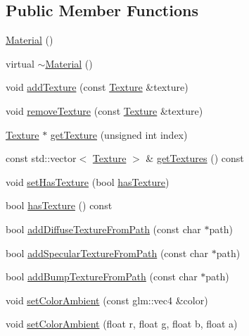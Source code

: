 \subsection*{Public Member Functions}
\begin{DoxyCompactItemize}
\item 
\mbox{\hyperlink{classec_1_1_material_a259d88ca352df2d284380f0b37052652}{Material}} ()
\item 
virtual \mbox{\hyperlink{classec_1_1_material_aec5bd3f3ef761f49a5028b415a9de52e}{$\sim$\+Material}} ()
\item 
void \mbox{\hyperlink{classec_1_1_material_aad92ada3fcc1f7b66e6bf3b6aeac73b8}{add\+Texture}} (const \mbox{\hyperlink{classec_1_1_texture}{Texture}} \&texture)
\item 
void \mbox{\hyperlink{classec_1_1_material_a83a673bcbcdef42bcea99939e5d6ff03}{remove\+Texture}} (const \mbox{\hyperlink{classec_1_1_texture}{Texture}} \&texture)
\item 
\mbox{\hyperlink{classec_1_1_texture}{Texture}} $\ast$ \mbox{\hyperlink{classec_1_1_material_a8679615f24284e809f213b882bec81bf}{get\+Texture}} (unsigned int index)
\item 
const std\+::vector$<$ \mbox{\hyperlink{classec_1_1_texture}{Texture}} $>$ \& \mbox{\hyperlink{classec_1_1_material_a95d74f12ec9d69a764a249e36b6b857c}{get\+Textures}} () const
\item 
void \mbox{\hyperlink{classec_1_1_material_a135ee01e9b085d0d78468e47b76bd17a}{set\+Has\+Texture}} (bool \mbox{\hyperlink{classec_1_1_material_a961612ff2caee16d5d4b8f9b74042cf2}{has\+Texture}})
\item 
bool \mbox{\hyperlink{classec_1_1_material_a961612ff2caee16d5d4b8f9b74042cf2}{has\+Texture}} () const
\item 
bool \mbox{\hyperlink{classec_1_1_material_a15b5c4adb903b16c25ad312963027924}{add\+Diffuse\+Texture\+From\+Path}} (const char $\ast$path)
\item 
bool \mbox{\hyperlink{classec_1_1_material_a103e561a848fc52cd5ca5b45050f4318}{add\+Specular\+Texture\+From\+Path}} (const char $\ast$path)
\item 
bool \mbox{\hyperlink{classec_1_1_material_afed42a499ce0e662021fd5aa55092511}{add\+Bump\+Texture\+From\+Path}} (const char $\ast$path)
\item 
void \mbox{\hyperlink{classec_1_1_material_afdd82441b5b2168161a17824e4a90f6f}{set\+Color\+Ambient}} (const glm\+::vec4 \&color)
\item 
void \mbox{\hyperlink{classec_1_1_material_a4ee41422a7625ac8a9f8a5e52bb18cf7}{set\+Color\+Ambient}} (float r, float g, float b, float a)

\end{DoxyCompactItemize}

